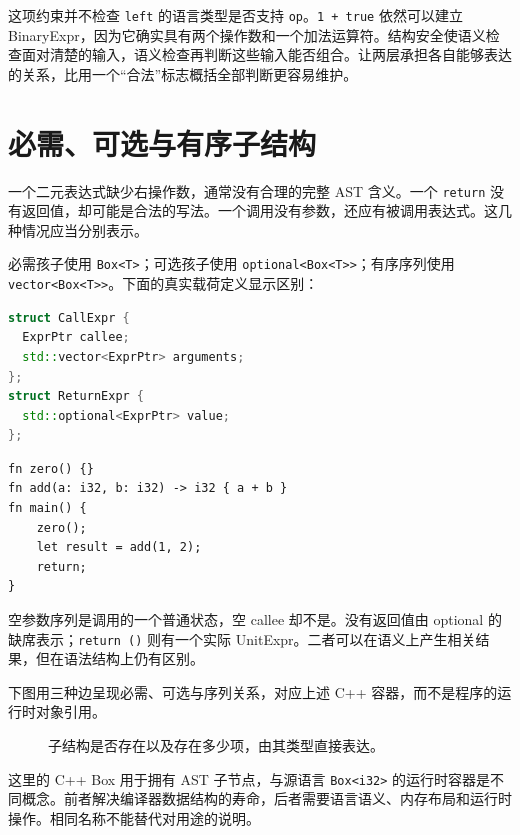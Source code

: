 这项约束并不检查 \texttt{left} 的语言类型是否支持 \texttt{op}。\texttt{1 + true} 依然可以建立 BinaryExpr，因为它确实具有两个操作数和一个加法运算符。结构安全使语义检查面对清楚的输入，语义检查再判断这些输入能否组合。让两层承担各自能够表达的关系，比用一个“合法”标志概括全部判断更容易维护。

\section{必需、可选与有序子结构}
一个二元表达式缺少右操作数，通常没有合理的完整 AST 含义。一个 \texttt{return} 没有返回值，却可能是合法的写法。一个调用没有参数，还应有被调用表达式。这几种情况应当分别表示。

必需孩子使用 \texttt{Box<T>}；可选孩子使用 \texttt{optional<Box<T>>}；有序序列使用 \texttt{vector<Box<T>>}。下面的真实载荷定义显示区别：
\begin{lstlisting}[language=C++]
struct CallExpr {
  ExprPtr callee;
  std::vector<ExprPtr> arguments;
};
struct ReturnExpr {
  std::optional<ExprPtr> value;
};
\end{lstlisting}
\begin{lstlisting}[language=Rustless]
fn zero() {}
fn add(a: i32, b: i32) -> i32 { a + b }
fn main() {
    zero();
    let result = add(1, 2);
    return;
}
\end{lstlisting}
空参数序列是调用的一个普通状态，空 callee 却不是。没有返回值由 optional 的缺席表示；\texttt{return ()} 则有一个实际 UnitExpr。二者可以在语义上产生相关结果，但在语法结构上仍有区别。

下图用三种边呈现必需、可选与序列关系，对应上述 C++ 容器，而不是程序的运行时对象引用。
\begin{figure}[htbp]
\centering
{}
\caption{子结构是否存在以及存在多少项，由其类型直接表达。}
\end{figure}
这里的 C++ Box 用于拥有 AST 子节点，与源语言 \texttt{Box<i32>} 的运行时容器是不同概念。前者解决编译器数据结构的寿命，后者需要语言语义、内存布局和运行时操作。相同名称不能替代对用途的说明。


